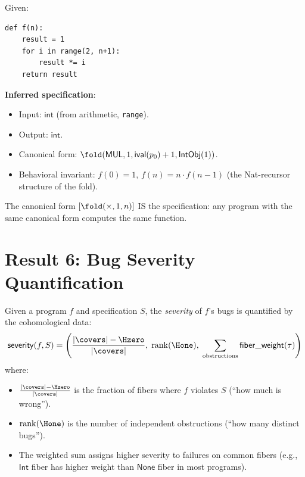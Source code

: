 \begin{example}
Given:
\begin{lstlisting}
def f(n):
    result = 1
    for i in range(2, n+1):
        result *= i
    return result
\end{lstlisting}

\textbf{Inferred specification}:
\begin{itemize}
  \item Input: $\mathsf{int}$ (from arithmetic, \texttt{range}).
  \item Output: $\mathsf{int}$.
  \item Canonical form: $\fold(\mathsf{MUL}, 1, \mathsf{ival}(p_0)+1,
    \mathsf{IntObj}(1))$.
  \item Behavioral invariant: $f(0) = 1$, $f(n) = n \cdot f(n-1)$
    (the Nat-recursor structure of the fold).
\end{itemize}

The canonical form $[\fold(\times, 1, n)]$ IS the specification:
any program with the same canonical form computes the same function.
\end{example}

\section{Result 6: Bug Severity Quantification}

\begin{theorem}
\label{thm:bug-severity}
Given a program $f$ and specification $S$, the \emph{severity} of
$f$'s bugs is quantified by the cohomological data:
\[
  \mathsf{severity}(f, S) = \left(\frac{|\covers| - \Hzero}{|\covers|},\;
    \mathrm{rank}(\Hone),\;
    \sum_{\text{obstructions}} \mathsf{fiber\_weight}(\tau)\right)
\]
where:
\begin{itemize}
  \item $\frac{|\covers| - \Hzero}{|\covers|}$ is the fraction of
    fibers where $f$ violates $S$ (``how much is wrong'').
  \item $\mathrm{rank}(\Hone)$ is the number of independent
    obstructions (``how many distinct bugs'').
  \item The weighted sum assigns higher severity to failures on
    common fibers (e.g., $\mathsf{Int}$ fiber has higher weight
    than $\mathsf{None}$ fiber in most programs).
\end{itemize}
\end{theorem}

